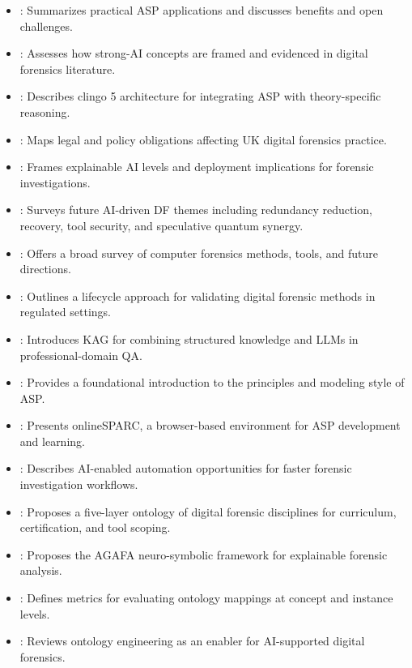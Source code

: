 \documentclass[11pt]{article}
\begin{document}
\begin{itemize}
  \item \textcite{erdem2016aspapps}: Summarizes practical ASP applications and discusses benefits and open challenges.
  \item \textcite{fahndrich2023strongai}: Assesses how strong-AI concepts are framed and evidenced in digital forensics literature.
  \item \textcite{gebser2016clingo5}: Describes clingo 5 architecture for integrating ASP with theory-specific reasoning.
  \item \textcite{goldstrawwhite2022legalpolicy}: Maps legal and policy obligations affecting UK digital forensics practice.
  \item \textcite{hall2022xai}: Frames explainable AI levels and deployment implications for forensic investigations.
  \item \textcite{iyengar2025futureaidf}: Surveys future AI-driven DF themes including redundancy reduction, recovery, tool security, and speculative quantum synergy.
  \item \textcite{javed2022comprehensivesurvey}: Offers a broad survey of computer forensics methods, tools, and future directions.
  \item \textcite{fsr2015g218}: Outlines a lifecycle approach for validating digital forensic methods in regulated settings.
  \item \textcite{liang2025kag}: Introduces KAG for combining structured knowledge and LLMs in professional-domain QA.
  \item \textcite{lifschitz2008whatisasp}: Provides a foundational introduction to the principles and modeling style of ASP.
  \item \textcite{marcopoulos2018onlinesparc}: Presents onlineSPARC, a browser-based environment for ASP development and learning.
  \item \textcite{kadage2024aienhanceddf}: Describes AI-enabled automation opportunities for faster forensic investigation workflows.
  \item \textcite{karie2014dfdisciplinesontology}: Proposes a five-layer ontology of digital forensic disciplines for curriculum, certification, and tool scoping.
  \item \textcite{parsonage2025agafa}: Proposes the AGAFA neuro-symbolic framework for explainable forensic analysis.
  \item \textcite{pietranik2020ontologymappings}: Defines metrics for evaluating ontology mappings at concept and instance levels.
  \item \textcite{sikos2021ontologydf}: Reviews ontology engineering as an enabler for AI-supported digital forensics.

\end{itemize}
\end{document}
